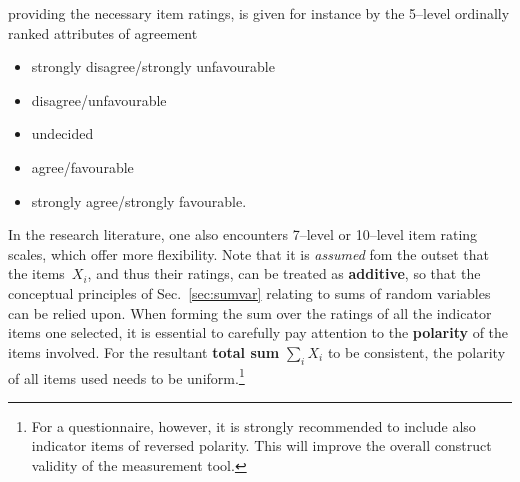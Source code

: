 providing the necessary item ratings, is given for instance by the 
5--level ordinally ranked attributes of agreement\\[-5mm]
%
\begin{itemize}
\item[1:] strongly disagree/strongly unfavourable\\[-5mm]
\item[2:] disagree/unfavourable\\[-5mm]
\item[3:] undecided\\[-5mm]
\item[4:] agree/favourable\\[-5mm]
\item[5:] strongly agree/strongly favourable.\\[-5mm]
\end{itemize}
%
In the research literature, one also encounters 7--level or 
10--level item rating scales, which offer more flexibility. Note 
that it is \textit{assumed} fom the outset that the items~$X_{i}$, 
and thus their ratings, can be treated as \textbf{additive}, so
that the conceptual principles of Sec.~\ref{sec:sumvar} relating to 
sums of random variables can be relied upon. When forming the sum 
over the ratings of all the indicator items one selected, it is 
essential to carefully pay attention to the \textbf{polarity} of
the items involved. For the resultant \textbf{total sum} 
${\displaystyle\sum_{i}X_{i}}$ to be consistent, the polarity of 
all items used needs to be uniform.\footnote{For a questionnaire, 
however, it is strongly recommended to include also indicator 
items of reversed polarity. This will improve the overall 
construct validity of the measurement tool.}

